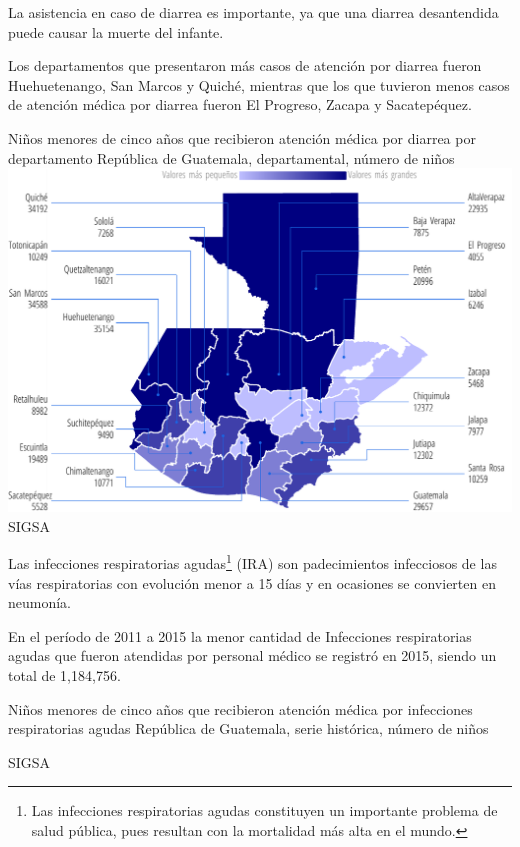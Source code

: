 
%
{%
	La asistencia en caso de diarrea es importante, ya que una diarrea desantendida puede causar la muerte del infante.
	
	Los departamentos que presentaron más casos de atención por diarrea fueron Huehuetenango, San Marcos y Quiché, mientras que los que tuvieron menos casos de atención médica por diarrea fueron El Progreso, Zacapa y Sacatepéquez. 
}%
{%
	Niños menores de cinco años que recibieron atención médica por diarrea por departamento} %
{%
	República de Guatemala, departamental, número de niños} %
{%
	\includegraphics[width=52\cuadri]{graficas/5_14.pdf}}%
{%
	SIGSA} %


%
{%
	Las infecciones respiratorias agudas\footnote{Las infecciones respiratorias agudas constituyen un importante problema de salud pública, pues resultan con la mortalidad más alta en el mundo.} (IRA) son padecimientos infecciosos de las vías respiratorias con evolución menor a 15 días y en ocasiones se convierten en neumonía. 
	
	En el período de 2011  a 2015 la menor cantidad de Infecciones respiratorias agudas que fueron atendidas por personal médico se registró en 2015, siendo un total de 1,184,756.
}%
{%
	Niños menores de cinco años que recibieron atención médica por infecciones respiratorias agudas} %
{%
	República de Guatemala, serie histórica, número de niños} %
{%
	\begin{tikzpicture}[x=1pt,y=1pt]    \end{tikzpicture}}%
{%
	SIGSA} %

